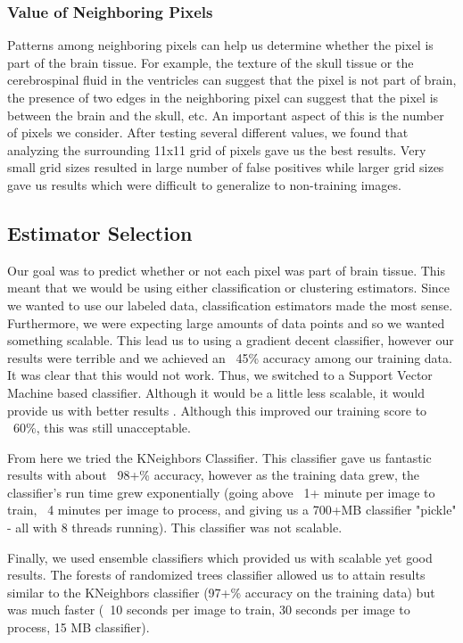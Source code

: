 \documentclass[letterpaper, 10 pt, conference]{ieeeconf}
\begin{document}
\subsubsection{Value of Neighboring Pixels}
Patterns among neighboring pixels can help us determine whether the pixel is part of the brain tissue. For example, the texture of the skull tissue or the cerebrospinal fluid in the ventricles can suggest that the pixel is not part of brain, the presence of two edges in the neighboring pixel can suggest that the pixel is between the brain and the skull, etc. An important aspect of this is the number of pixels we consider. After testing several different values, we found that analyzing the surrounding 11x11 grid of pixels gave us the best results. Very small grid sizes resulted in large number of false positives while larger grid sizes gave us results which were difficult to generalize to non-training images. 

\subsection{Estimator Selection}
Our goal was to predict whether or not each pixel was part of brain tissue. This meant that we would be using either classification or clustering estimators. Since we wanted to use our labeled data, classification estimators made the most sense. Furthermore, we were expecting large amounts of data points and so we wanted something scalable. This lead us to using a gradient decent classifier, however our results were terrible and we achieved an ~45\% accuracy among our training data. It was clear that this would not work. Thus, we switched to a Support Vector Machine based classifier. Although it would be a little less scalable, it would provide us with better results . Although this improved our training score to ~60\%, this was still unacceptable. \par
From here we tried the KNeighbors Classifier. This classifier gave us fantastic results with about ~98+\% accuracy, however as the training data grew, the classifier's run time grew exponentially (going above ~1+ minute per image to train, ~4 minutes per image to process, and giving us a 700+MB classifier "pickle" - all with 8 threads running). This classifier was not scalable. \par
Finally, we used ensemble classifiers which provided us with scalable yet good results. The forests of randomized trees classifier allowed us to attain results similar to the KNeighbors classifier (97+\% accuracy on the training data) but was much faster (~10 seconds per image to train, 30 seconds per image to process, 15 MB classifier). 
\end{document}
